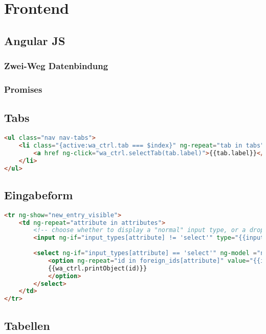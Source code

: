 \section{Frontend}

\subsection{Angular JS}

\subsubsection{Zwei-Weg Datenbindung}

\subsubsection{Promises}

\subsection{Tabs}

\scriptsize
\begin{lstlisting}[caption=index.html, label=cs:tabs, language=HTML]
<ul class="nav nav-tabs">
	<li class="{active:wa_ctrl.tab === $index}" ng-repeat="tab in tabs">
		<a href ng-click="wa_ctrl.selectTab(tab.label)">{{tab.label}}</a></li>
	</li>
</ul>
\end{lstlisting}
\normalsize

\subsection{Eingabeform}

\scriptsize
\begin{lstlisting}[caption=index.html, label=cs:input_form, language=HTML]
<tr ng-show="new_entry_visible">
	<td ng-repeat="attribute in attributes">
		<!-- choose whether to display a "normal" input type, or a dropdown-list-->
		<input ng-if="input_types[attribute] != 'select'" type="{{input_types[attribute]}}" name="{{attribute}}" ng-model="new_db_object[attribute]" />
		
		<select ng-if="input_types[attribute] == 'select'" ng-model ="new_db_object[attribute]">
			<option ng-repeat="id in foreign_ids[attribute]" value="{{id}}">
			{{wa_ctrl.printObject(id)}}
			</option>
		</select>
	</td>
</tr>
\end{lstlisting}
\normalsize 

\subsection{Tabellen}

